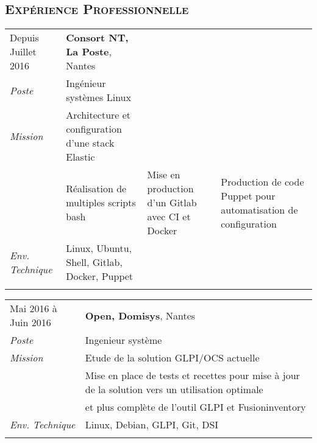 \documentclass[a4paper]{article}
\newcommand{\hsubsection}[1]{\subsection*{\fontfamily{phv}\selectfont\textsc{#1}}}
\begin{document}
\hsubsection{Expérience Professionnelle}
\begin{tabular}{P{3.5cm}|p{13cm}}
Depuis Juillet 2016		& \textbf{Consort NT, La Poste}, Nantes\\
\textsl{Poste}			& Ingénieur systèmes Linux\\
\textsl{Mission}		& Architecture et configuration d'une stack Elastic\\
				& Réalisation de multiples scripts bash
				& Mise en production d'un Gitlab avec CI et Docker
				& Production de code Puppet pour automatisation de configuration
				& \\
\textsl{Env. Technique}		& Linux, Ubuntu, Shell, Gitlab, Docker, Puppet \\
& \\
\end{tabular}

\begin{tabular}{P{3.5cm}|p{13cm}}
Mai 2016 à Juin 2016		& \textbf{Open, Domisys}, Nantes\\
\textsl{Poste}			& Ingenieur système\\
\textsl{Mission}		& Etude de la solution GLPI/OCS actuelle\\
				& Mise en place de tests et recettes pour mise à jour de la solution vers un utilisation optimale\\
				& et plus complète de l'outil GLPI et Fusioninventory\\
\textsl{Env. Technique}		& Linux, Debian, GLPI, Git, DSI \\
 & \\
\end{tabular}
\end{document}
